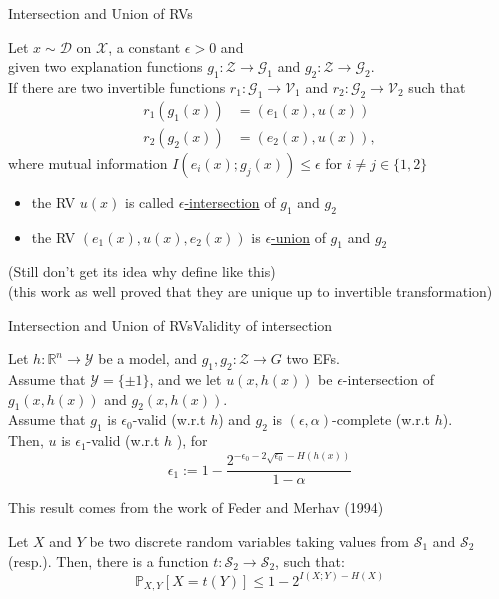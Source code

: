 \documentclass[10pt, aspectratio=169]{beamer}
\begin{document}
	\begin{frame}{Intersection and Union of RVs}
		\begin{definition}
			Let $x\sim\mathcal{D}$ on $\mathcal{X}$, a constant $\epsilon>0$ and\\
			given two explanation functions $g_1:\mathcal{Z}\to\mathcal{G}_1$ and $g_2:\mathcal{Z}\to\mathcal{G}_2$.\\
			If there are two invertible functions $r_1:\mathcal{G}_1\to\mathcal{V}_1$ and $r_2:\mathcal{G}_2\to\mathcal{V}_2$
			such that
			\begin{align*}
				r_1(g_1(x)) &= (e_1(x),u(x))\\
				r_2(g_2(x)) &= (e_2(x),u(x)),
			\end{align*}
			where mutual information $I(e_i(x);g_j(x))\leqslant\epsilon$ for $i\neq j\in\{1,2\}$
			\begin{itemize}
				\item the RV $u(x)$ is called \underline{$\epsilon$-intersection} of $g_1$ and $g_2$
				\item the RV $(e_1(x), u(x), e_2(x))$ is \underline{$\epsilon$-union} of $g_1$ and $g_2$
			\end{itemize}
		\end{definition}
		(Still don't get its idea why define like this)\\
		(this work as well proved that they are unique up to invertible transformation)
	\end{frame}
	
	\begin{frame}{Intersection and Union of RVs}{Validity of intersection}
		
		\begin{theorem}
			Let $h: \mathbb{R}^n \rightarrow \mathcal{Y}$ be a model, and $g_1, g_2: \mathcal{Z} \rightarrow G$ two EFs.\\
			Assume that $\mathcal{Y}=\{ \pm 1\}$, and we let $u(x, h(x))$ be $\epsilon$-intersection of $g_1(x, h(x))$ and $g_2(x, h(x))$.\\
			Assume that $g_1$ is $\epsilon_0$-valid (w.r.t $h$) and $g_2$ is $(\epsilon, \alpha)$-complete (w.r.t $h$).\\
			Then, $u$ is $\epsilon_1$-valid (w.r.t $h$ ), for $$
			\epsilon_1:=1-\frac{2^{-\epsilon_0-2 \sqrt{\epsilon_0}-H(h(x))}}{1-\alpha}
			$$
		\end{theorem}
		This result comes from the work of Feder and Merhav (1994)
		\begin{lemma}
		Let $X$ and $Y$ be two discrete random variables taking values from $\mathcal{S}_1$ and $\mathcal{S}_2$ (resp.). Then, there is a function $t: \mathcal{S}_2 \rightarrow \mathcal{S}_2$, such that:
			$$
			\mathbb{P}_{X, Y}[X=t(Y)] \leq 1-2^{I(X ; Y)-H(X)}
			$$
		\end{lemma}
	\end{frame}
	
\end{document}

